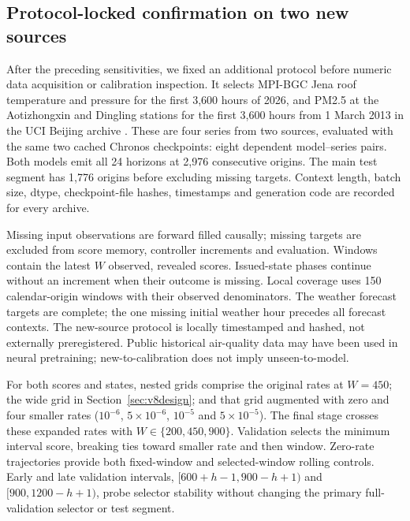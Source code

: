 \subsection{Protocol-locked confirmation on two new sources}\label{sec:newdesign}
After the preceding sensitivities, we fixed an additional protocol before numeric data
acquisition or calibration inspection. It selects MPI-BGC Jena roof temperature and
pressure for the first 3,600 hours of 2026, and PM2.5 at the Aotizhongxin and Dingling
stations for the first 3,600 hours from 1 March 2013 in the UCI Beijing archive
\citep{jena2026weather,chen2017air}. These are four series from two sources, evaluated
with the same two cached Chronos checkpoints: eight dependent model--series pairs.
Both models emit all 24 horizons at 2,976 consecutive origins. The main test segment
has 1,776 origins before excluding missing targets. Context length, batch size, dtype,
checkpoint-file hashes, timestamps and generation code are recorded for every archive.

Missing input observations are forward filled causally; missing targets are excluded
from score memory, controller increments and evaluation. Windows contain the latest
$W$ observed, revealed scores. Issued-state phases continue without an increment when
their outcome is missing. Local coverage uses 150 calendar-origin windows with their
observed denominators. The weather forecast targets are complete; the one missing
initial weather hour precedes all forecast contexts. The new-source protocol is locally
timestamped and hashed, not externally preregistered. Public historical air-quality data
may have been used in neural pretraining; new-to-calibration does not imply unseen-to-model.

For both scores and states, nested grids comprise the original rates at $W=450$;
the wide grid in Section~\ref{sec:v8design}; and that grid augmented with zero
and four smaller rates ($10^{-6}$, $5\times10^{-6}$, $10^{-5}$ and $5\times10^{-5}$).
The final stage crosses these expanded rates with $W\in\{200,450,900\}$. Validation selects the minimum interval
score, breaking ties toward smaller rate and then window. Zero-rate trajectories
provide both fixed-window and selected-window rolling controls. Early and late
validation intervals, $[600+h-1,900-h+1)$ and $[900,1200-h+1)$, probe selector
stability without changing the primary full-validation selector or test segment.

